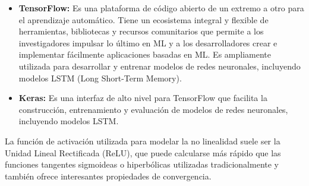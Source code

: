 \begin{itemize}
  \item \textbf{TensorFlow:} Es una plataforma de código abierto de un extremo a otro para el aprendizaje automático. Tiene un ecosistema integral y flexible de herramientas, bibliotecas y recursos comunitarios que permite a los investigadores impulsar lo último en ML y a los desarrolladores crear e implementar fácilmente aplicaciones basadas en ML.
  Es ampliamente utilizada para desarrollar y entrenar modelos de redes neuronales, incluyendo modelos LSTM (Long Short-Term Memory).
  \item \textbf{Keras:} Es una interfaz de alto nivel para TensorFlow que facilita la construcción, entrenamiento y evaluación de modelos de redes neuronales, incluyendo modelos LSTM.
\end{itemize}



La función de activación utilizada para modelar la no linealidad suele ser la Unidad Lineal Rectificada (ReLU), que puede calcularse más rápido que las funciones tangentes sigmoideas o hiperbólicas utilizadas tradicionalmente y también ofrece interesantes propiedades de convergencia.




